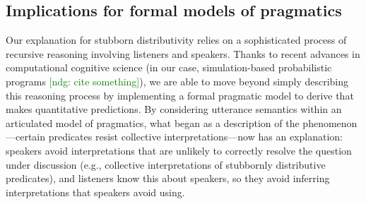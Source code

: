 \documentclass[linguex]{sp}
\newcommand{\ndg}[1]{\textcolor{Green}{[ndg: #1]}}
\begin{document}



\subsection{Implications for formal models of pragmatics}


Our explanation for stubborn distributivity relies on a sophisticated process of recursive reasoning involving listeners and speakers. 
Thanks to recent advances in computational cognitive science (in our case, simulation-based probabilistic programs \ndg{cite something}), we are able to move beyond simply describing this reasoning process by implementing a formal pragmatic model to derive that makes quantitative predictions. 
By considering utterance semantics within an articulated model of pragmatics, what began as a description of the phenomenon---certain predicates resist collective interpretations---now has an explanation: speakers avoid interpretations that are unlikely to correctly resolve the question under discussion (e.g., collective interpretations of stubbornly distributive predicates), and listeners know this about speakers, so they avoid inferring interpretations that speakers avoid using.
\end{document}
